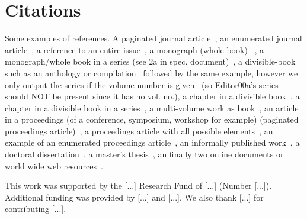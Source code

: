 \documentclass[sigconf, nonacm]{acmart}
\begin{document}
\section{Citations}

Some examples of references. A paginated journal article~\cite{Abril07}, an enumerated journal article~\cite{Cohen07}, a reference to an entire issue~\cite{JCohen96}, a monograph (whole book) ~\cite{Kosiur01}, a monograph/whole book in a series (see 2a in spec. document)~\cite{Harel79}, a divisible-book such as an anthology or compilation~\cite{Editor00} followed by the same example, however we only output the series if the volume number is given~\cite{Editor00a} (so Editor00a's series should NOT be present since it has no vol. no.), a chapter in a divisible book~\cite{Spector90}, a chapter in a divisible book in a series~\cite{Douglass98}, a multi-volume work as book~\cite{Knuth97}, an article in a proceedings (of a conference, symposium, workshop for example) (paginated proceedings article)~\cite{Andler79}, a proceedings article with all possible elements~\cite{Smith10}, an example of an enumerated proceedings article~\cite{VanGundy07}, an informally published work~\cite{Harel78}, a doctoral dissertation~\cite{Clarkson85}, a master's thesis~\cite{anisi03}, an finally two online documents or world wide web resources~\cite{Thornburg01, Ablamowicz07}.

\begin{acks}
 This work was supported by the [...] Research Fund of [...] (Number [...]). Additional funding was provided by [...] and [...]. We also thank [...] for contributing [...].
\end{acks}




\end{document}
